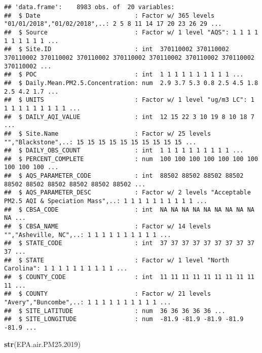 \documentclass[]{article}
\newenvironment{Shaded}{\begin{snugshade}}{\end{snugshade}}
\newcommand{\FloatTok}[1]{\textcolor[rgb]{0.00,0.00,0.81}{#1}}
\newcommand{\KeywordTok}[1]{\textcolor[rgb]{0.13,0.29,0.53}{\textbf{#1}}}
\newcommand{\NormalTok}[1]{#1}
\begin{document}
\begin{verbatim}
## 'data.frame':    8983 obs. of  20 variables:
##  $ Date                          : Factor w/ 365 levels "01/01/2018","01/02/2018",..: 2 5 8 11 14 17 20 23 26 29 ...
##  $ Source                        : Factor w/ 1 level "AQS": 1 1 1 1 1 1 1 1 1 1 ...
##  $ Site.ID                       : int  370110002 370110002 370110002 370110002 370110002 370110002 370110002 370110002 370110002 370110002 ...
##  $ POC                           : int  1 1 1 1 1 1 1 1 1 1 ...
##  $ Daily.Mean.PM2.5.Concentration: num  2.9 3.7 5.3 0.8 2.5 4.5 1.8 2.5 4.2 1.7 ...
##  $ UNITS                         : Factor w/ 1 level "ug/m3 LC": 1 1 1 1 1 1 1 1 1 1 ...
##  $ DAILY_AQI_VALUE               : int  12 15 22 3 10 19 8 10 18 7 ...
##  $ Site.Name                     : Factor w/ 25 levels "","Blackstone",..: 15 15 15 15 15 15 15 15 15 15 ...
##  $ DAILY_OBS_COUNT               : int  1 1 1 1 1 1 1 1 1 1 ...
##  $ PERCENT_COMPLETE              : num  100 100 100 100 100 100 100 100 100 100 ...
##  $ AQS_PARAMETER_CODE            : int  88502 88502 88502 88502 88502 88502 88502 88502 88502 88502 ...
##  $ AQS_PARAMETER_DESC            : Factor w/ 2 levels "Acceptable PM2.5 AQI & Speciation Mass",..: 1 1 1 1 1 1 1 1 1 1 ...
##  $ CBSA_CODE                     : int  NA NA NA NA NA NA NA NA NA NA ...
##  $ CBSA_NAME                     : Factor w/ 14 levels "","Asheville, NC",..: 1 1 1 1 1 1 1 1 1 1 ...
##  $ STATE_CODE                    : int  37 37 37 37 37 37 37 37 37 37 ...
##  $ STATE                         : Factor w/ 1 level "North Carolina": 1 1 1 1 1 1 1 1 1 1 ...
##  $ COUNTY_CODE                   : int  11 11 11 11 11 11 11 11 11 11 ...
##  $ COUNTY                        : Factor w/ 21 levels "Avery","Buncombe",..: 1 1 1 1 1 1 1 1 1 1 ...
##  $ SITE_LATITUDE                 : num  36 36 36 36 36 ...
##  $ SITE_LONGITUDE                : num  -81.9 -81.9 -81.9 -81.9 -81.9 ...
\end{verbatim}

\begin{Shaded}
\begin{Highlighting}[]
\KeywordTok{str}\NormalTok{(EPA.air.PM25}\FloatTok{.2019}\NormalTok{)}
\end{Highlighting}
\end{Shaded}
\end{document}
